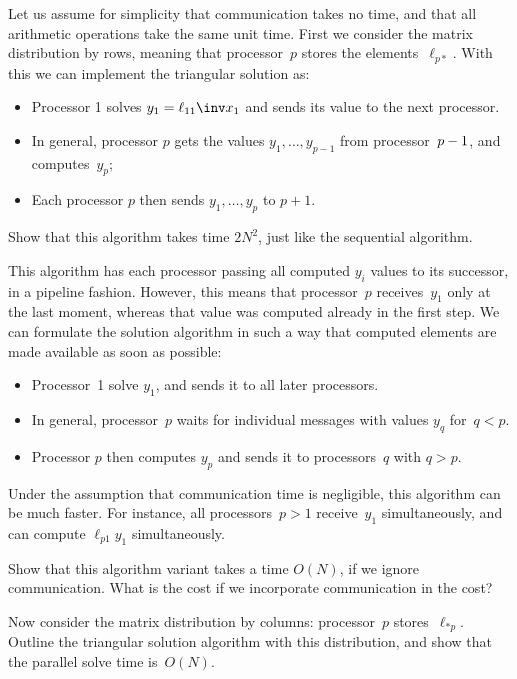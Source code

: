 Let us assume for simplicity that communication takes no time, and
that all arithmetic operations take the same unit time.
First we consider the matrix distribution by rows,
meaning that processor~$p$ stores the elements~$\ell_{p*}$.
With this we can implement the triangular solution as:
\begin{itemize}
\item Processor 1 solves $y_1=\ell_{11}\inv x_1$ and sends its value to the next processor.
\item In general, processor $p$ gets the values $y_1,\ldots,y_{p-1}$
  from processor~$p-\nobreak1$, and computes~$y_p$;
\item Each processor $p$ then sends $y_1,\ldots,y_p$ to $p+1$.
\end{itemize}

\begin{exercise}
  Show that this algorithm takes time $2N^2$, just like the sequential algorithm.
\end{exercise}

This algorithm has each processor passing all computed $y_i$ values to its successor, in a pipeline fashion.
However, this means that processor~$p$ receives~$y_1$ only at the last moment, whereas that value was computed
already in the first step. We can formulate the solution algorithm in such a way that computed elements
are made available as soon as possible:
\begin{itemize}
\item Processor~1 solve $y_1$, and sends it to all later processors.
\item In general, processor~$p$ waits for individual messages with values $y_q$ for~$q<p$.
\item Processor $p$ then computes $y_p$ and sends it to processors~$q$ with $q>p$.
\end{itemize}

Under the assumption that communication time is negligible, this algorithm can be much faster.
For instance, all processors~$p>1$ receive~$y_1$ simultaneously, and can compute $\ell_{p1}y_1$
simultaneously.

\begin{exercise}
  Show that this algorithm variant takes a time $O(N)$,
  if we ignore communication.
  What is the cost if we incorporate communication in the cost?
\end{exercise}

\begin{exercise}
  Now consider the matrix distribution by columns: processor~$p$ stores~$\ell_{*p}$.
  Outline the triangular solution algorithm with this distribution, and show that the
  parallel solve time is~$O(N)$.
\end{exercise}

